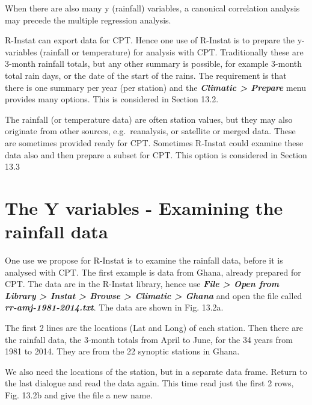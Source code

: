 \documentclass[
  letterpaper,
  DIV=11,
  numbers=noendperiod]{scrreprt}
\begin{document}
When there are also many y (rainfall) variables, a canonical correlation
analysis may precede the multiple regression analysis.

R-Instat can export data for CPT. Hence one use of R-Instat is to
prepare the y-variables (rainfall or temperature) for analysis with CPT.
Traditionally these are 3-month rainfall totals, but any other summary
is possible, for example 3-month total rain days, or the date of the
start of the rains. The requirement is that there is one summary per
year (per station) and the \textbf{\emph{Climatic \textgreater{}
Prepare}} menu provides many options. This is considered in Section
13.2.

The rainfall (or temperature data) are often station values, but they
may also originate from other sources, e.g.~reanalysis, or satellite or
merged data. These are sometimes provided ready for CPT. Sometimes
R-Instat could examine these data also and then prepare a subset for
CPT. This option is considered in Section 13.3

\section{The Y variables - Examining the rainfall
data}\label{the-y-variables---examining-the-rainfall-data}

One use we propose for R-Instat is to examine the rainfall data, before
it is analysed with CPT. The first example is data from Ghana, already
prepared for CPT. The data are in the R-Instat library, hence use
\textbf{\emph{File \textgreater{} Open from Library \textgreater{}
Instat \textgreater{} Browse \textgreater{} Climatic \textgreater{}
Ghana}} and open the file called \textbf{\emph{rr-amj-1981-2014.txt}}.
The data are shown in Fig. 13.2a.

The first 2 lines are the locations (Lat and Long) of each station. Then
there are the rainfall data, the 3-month totals from April to June, for
the 34 years from 1981 to 2014. They are from the 22 synoptic stations
in Ghana.

We also need the locations of the station, but in a separate data frame.
Return to the last dialogue and read the data again. This time read just
the first 2 rows, Fig. 13.2b and give the file a new name.
\end{document}

